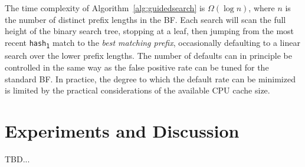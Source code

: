 \documentclass[conference,compsoc]{IEEEtran}
\begin{document}
The time
complexity of Algorithm~\ref{alg:guidedsearch} is $\Omega(\log n)$, 
where $n$ is the number of distinct prefix lengths in the BF. Each
search will scan the full height of the binary search tree, stopping at
a leaf, then jumping from the most recent \texttt{hash\textsubscript{1}} match
to the \emph{best matching prefix}, occasionally defaulting to a linear
search over the lower prefix lengths. The number of defaults can in principle be controlled in the same
way as the false positive rate can be tuned for the standard BF.
In practice, the degree to which the default rate can be minimized is
limited by the practical considerations of the available CPU cache size.

\section{Experiments and Discussion}
TBD...




\end{document}
